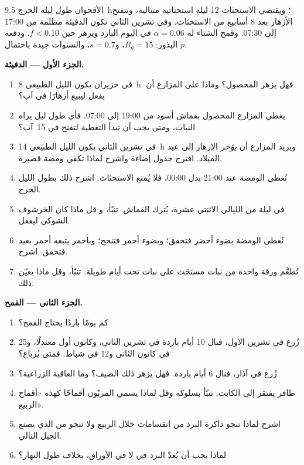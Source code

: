 \begin{problem}
\label{pb:b2:plant-flowering:1}
الأقحوان  طول ليله الحرج
\qty{9.5}{h}؛ ويقتضي الاستحثاث \num{12} ليلة استحثاثية
متتالية، وتتفتح الأزهار بعد \num{8} أسابيع من الاستحثاث. وفي تشرين الثاني
تكون الدفيئة مظلمة من 17:00 إلى 07:30. وقمح الشتاء
له $\alpha = 0.06$ في اليوم البارد ويزهر حين $f < 0.10$. ودفعة
البذور: $R_g = 15$، و$s = 0.7$، والسنوات جيدة باحتمال $p$.

\medskip
\noindent\textbf{الجزء الأول --- الدفيئة.}
\begin{enumerate}
  \item في حزيران يكون الليل الطبيعي \qty{8}{h}. فهل يزهر
        المحصول؟ وماذا على المزارع أن يفعل ليبيع أزهارًا في آب؟
  \item يغطي المزارع المحصول بقماش أسود من
        19:00 إلى 07:00. فأي طول ليل يراه
        النبات، ومتى يجب أن تبدأ التغطية لتفتح في
        15~آب؟
  \item في تشرين الثاني يكون الليل الطبيعي \qty{14}{h} ويريد المزارع
        أن \emph{يؤخر} الإزهار إلى عيد الميلاد. اقترح جدول
        إضاءة واشرح لماذا تكفي ومضة قصيرة.
  \item تُعطى الومضة عند 21:00 بدل 00:00،
        فلا يُمنع الاستحثاث. اشرح ذلك بطول
        الليل الحرج.
  \item في ليلة من الليالي الاثنتي عشرة، يُترك القماش. تنبّأ، و
        قل ماذا كان الخرشوف الشوكي ليفعل.
  \item تُعطى الومضة بضوء أخضر فتخفق؛ وبضوء أحمر
        فتنجح؛ وبأحمر يتبعه أحمر بعيد فتخفق. اشرح.
  \item تُطعَّم ورقة واحدة من نبات مستحَث على نبات
        تحت أيام طويلة. تنبّأ، وقل ماذا يعيّن ذلك.
\end{enumerate}

\medskip
\noindent\textbf{الجزء الثاني --- القمح.}
\begin{enumerate}[resume]
  \item كم يومًا باردًا يحتاج القمح؟
  \item زُرع في تشرين الأول، فنال 10 أيام باردة في تشرين الثاني، وكانون
        أول معتدلًا، و25 في كانون الثاني و12 في شباط. فمتى
        يُرباع؟
  \item زُرع في آذار، فنال 6 أيام باردة. فهل يزهر ذلك
        الصيف؟ وما العاقبة الزراعية؟
  \item طافر يفتقر إلى الكابت. تنبّأ بسلوكه وقل
        لماذا يسمي المربّون أقماحًا كهذه «أقماح الربيع».
  \item اشرح لماذا تنجو ذاكرة البرد من انقسامات
         خلال الربيع ولا تنجو من  الذي يصنع
        الجيل التالي.
  \item لماذا يجب أن يُعدّ البرد في  لا في
        الأوراق، بخلاف طول النهار؟
\end{enumerate}


\end{problem}
